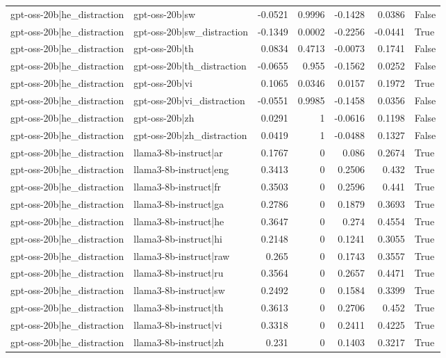 \begin{table}
\begin{tabular}{l l r r r r l}
gpt-oss-20b|he_distraction & gpt-oss-20b|sw & -0.0521 & 0.9996 & -0.1428 & 0.0386 & False \\
gpt-oss-20b|he_distraction & gpt-oss-20b|sw_distraction & -0.1349 & 0.0002 & -0.2256 & -0.0441 & True \\
gpt-oss-20b|he_distraction & gpt-oss-20b|th & 0.0834 & 0.4713 & -0.0073 & 0.1741 & False \\
gpt-oss-20b|he_distraction & gpt-oss-20b|th_distraction & -0.0655 & 0.955 & -0.1562 & 0.0252 & False \\
gpt-oss-20b|he_distraction & gpt-oss-20b|vi & 0.1065 & 0.0346 & 0.0157 & 0.1972 & True \\
gpt-oss-20b|he_distraction & gpt-oss-20b|vi_distraction & -0.0551 & 0.9985 & -0.1458 & 0.0356 & False \\
gpt-oss-20b|he_distraction & gpt-oss-20b|zh & 0.0291 & 1 & -0.0616 & 0.1198 & False \\
gpt-oss-20b|he_distraction & gpt-oss-20b|zh_distraction & 0.0419 & 1 & -0.0488 & 0.1327 & False \\
gpt-oss-20b|he_distraction & llama3-8b-instruct|ar & 0.1767 & 0 & 0.086 & 0.2674 & True \\
gpt-oss-20b|he_distraction & llama3-8b-instruct|eng & 0.3413 & 0 & 0.2506 & 0.432 & True \\
gpt-oss-20b|he_distraction & llama3-8b-instruct|fr & 0.3503 & 0 & 0.2596 & 0.441 & True \\
gpt-oss-20b|he_distraction & llama3-8b-instruct|ga & 0.2786 & 0 & 0.1879 & 0.3693 & True \\
gpt-oss-20b|he_distraction & llama3-8b-instruct|he & 0.3647 & 0 & 0.274 & 0.4554 & True \\
gpt-oss-20b|he_distraction & llama3-8b-instruct|hi & 0.2148 & 0 & 0.1241 & 0.3055 & True \\
gpt-oss-20b|he_distraction & llama3-8b-instruct|raw & 0.265 & 0 & 0.1743 & 0.3557 & True \\
gpt-oss-20b|he_distraction & llama3-8b-instruct|ru & 0.3564 & 0 & 0.2657 & 0.4471 & True \\
gpt-oss-20b|he_distraction & llama3-8b-instruct|sw & 0.2492 & 0 & 0.1584 & 0.3399 & True \\
gpt-oss-20b|he_distraction & llama3-8b-instruct|th & 0.3613 & 0 & 0.2706 & 0.452 & True \\
gpt-oss-20b|he_distraction & llama3-8b-instruct|vi & 0.3318 & 0 & 0.2411 & 0.4225 & True \\
gpt-oss-20b|he_distraction & llama3-8b-instruct|zh & 0.231 & 0 & 0.1403 & 0.3217 & True \\

\end{tabular}
\end{table}
